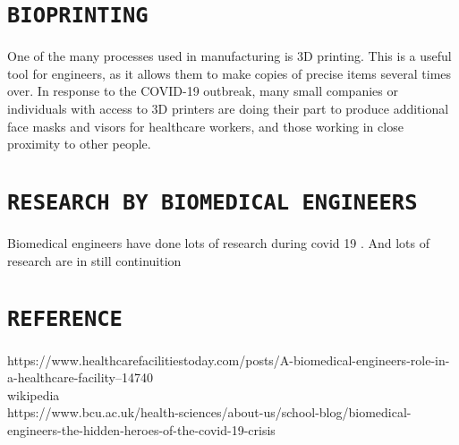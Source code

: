\documentclass[12pt]{article}
\begin{document}
\section{\Large\centering\texttt{BIOPRINTING}}
One of the many processes used in manufacturing is 3D printing. This is a useful tool for engineers, as it allows them to make copies of precise items several times over. In response to the COVID-19 outbreak, many small companies or individuals with access to 3D printers are doing their part to produce additional face masks and visors for healthcare workers, and those working in close proximity to other people. \\

\section{\Large\centering\texttt{RESEARCH BY BIOMEDICAL ENGINEERS}}
Biomedical engineers have done lots of research during covid 19 . And lots of research are in still continuition


\section{\Large\centering\texttt{REFERENCE}}
https://www.healthcarefacilitiestoday.com/posts/A-biomedical-engineers-role-in-a-healthcare-facility--14740\\
wikipedia\\
https://www.bcu.ac.uk/health-sciences/about-us/school-blog/biomedical-engineers-the-hidden-heroes-of-the-covid-19-crisis\\
\end{document}
